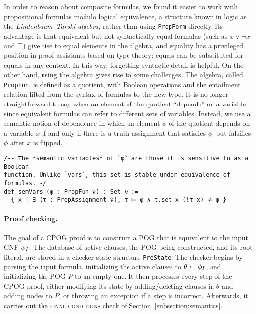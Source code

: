 In order to reason about composite formulas,
we found it easier to work with propositional formulas modulo logical equivalence,
a structure known in logic as the \emph{Lindenbaum--Tarski algebra},
rather than using \lstinline{PropForm} directly.
Its advantage is that equivalent but not syntactically equal formulas
(such as $x \vee \neg x$ and $\top$)
give rise to equal elements in the algebra,
and equality has a privileged position in proof assistants based on type theory:
equals can be substituted for equals in any context.
In this way, forgetting syntactic detail is helpful.
On the other hand,
using the algebra gives rise to some challenges.
The algebra, called {\tt PropFun}, is defined as a quotient,
with Boolean operations and the entailment relation
lifted from the syntax of formulas to the new type.
It is no longer straightforward to say
when an element of the quotient ``depends'' on a variable
since equivalent formulas can refer to different sets of variables.
Instead, we use a semantic notion of dependence
in which an element $\phi$ of the quotient depends on a variable $x$
if and only if there is a truth assignment that satisfies $\phi$,
but falsifies $\phi$ after $x$ is flipped.
\begin{lstlisting}
/-- The *semantic variables* of `φ` are those it is sensitive to as a Boolean
function. Unlike `vars`, this set is stable under equivalence of formulas. -/
def semVars (φ : PropFun ν) : Set ν :=
  { x | ∃ (τ : PropAssignment ν), τ ⊨ φ ∧ τ.set x (!τ x) ⊭ φ }
\end{lstlisting}

\paragraph{Proof checking.}
The goal of a CPOG proof is to construct a POG
that is equivalent to the input CNF $\phi_I$.
The database of active clauses,
the POG being constructed,
and its root literal,
are stored in a checker state structure {\tt PreState}.
The checker begins by parsing the input formula,
initializing the active clauses to $\theta \leftarrow \phi_I$,
and initializing the POG $P$ to an empty one.
It then processes every step of the CPOG proof,
either modifying its state by adding/deleting clauses in $\theta$
and adding nodes to $P$,
or throwing an exception if a step is incorrect.
Afterwards, it carries out the \textsc{final conditions} check of Section~\ref{subsection:semantics}.

